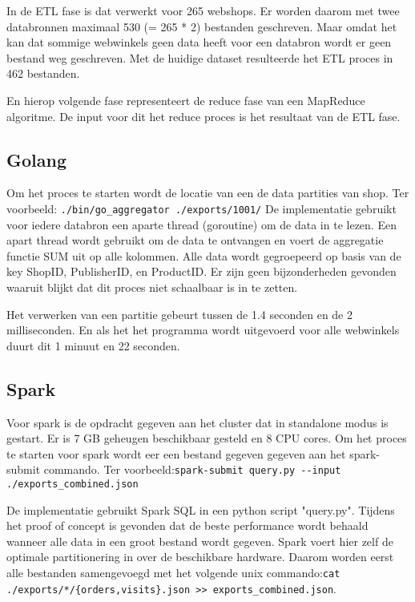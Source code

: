 In de ETL fase is dat verwerkt voor 265 webshops. Er worden daarom met twee databronnen maximaal 530  (= 265 * 2) bestanden geschreven. Maar omdat het kan dat sommige webwinkels geen data heeft voor een databron wordt er geen bestand weg geschreven. Met de huidige dataset resulteerde het ETL proces in 462 bestanden.

En hierop volgende fase representeert de reduce fase van een MapReduce algoritme. De input voor dit het reduce proces is het resultaat van de ETL fase.

\clearpage


\subsection{Golang}

Om het proces te starten wordt de locatie van een de data partities van shop. Ter voorbeeld: \newline\verb+./bin/go_aggregator ./exports/1001/+
De implementatie gebruikt voor iedere databron een aparte thread (goroutine) om de data in te lezen. Een apart thread wordt gebruikt om de data te ontvangen en voert de aggregatie functie SUM uit op alle kolommen. Alle data wordt gegroepeerd op basis van de key ShopID, PublisherID, en ProductID. Er zijn geen bijzonderheden gevonden waaruit blijkt dat dit proces niet schaalbaar is in te zetten.

Het verwerken van een partitie gebeurt tussen de 1.4 seconden en de 2 milliseconden. En als het het programma wordt uitgevoerd voor alle webwinkels duurt dit 1 minuut en 22 seconden.

\subsection{Spark}

Voor spark is de opdracht gegeven aan het cluster dat in standalone modus is gestart. Er is 7 GB geheugen beschikbaar gesteld en 8 CPU cores. Om het proces te starten voor spark wordt eer een bestand gegeven gegeven aan het spark-submit commando. Ter voorbeeld:\newline\verb+spark-submit query.py --input ./exports_combined.json+

De implementatie gebruikt Spark SQL in een python script "query.py". Tijdens het proof of concept is gevonden dat de beste performance wordt behaald wanneer alle data in een groot bestand wordt gegeven. Spark voert hier zelf de optimale partitionering in over de beschikbare hardware. Daarom worden eerst alle bestanden samengevoegd met het volgende unix commando:\newline\verb+cat ./exports/*/{orders,visits}.json >> exports_combined.json+.


